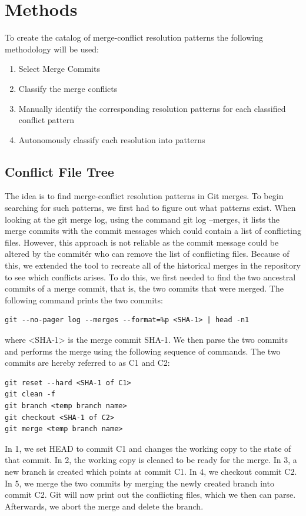 \chapter{Methods}
To create the catalog of merge-conflict resolution patterns the following methodology will be used:
\begin{enumerate}
\item Select Merge Commits
\item Classify the merge conflicts
\item Manually identify the corresponding resolution patterns for each classified conflict pattern
\item Autonomously classify each resolution into patterns
\end{enumerate}
\section{Conflict File Tree}
The idea is to find merge-conflict resolution patterns in Git merges. To begin searching for such patterns, we first had to figure out what patterns exist. When looking at the git merge log, using the command git log --merges, it lists the merge commits with the commit messages which could contain a list of conflicting files. However, this approach is not reliable as the commit message could be altered by the commitér who can remove the list of conflicting files. Because of this, we extended the tool to recreate all of the historical merges in the repository to see which conflicts arises. To do this, we first needed to find the two ancestral commits of a merge commit, that is, the two commits that were merged. The following command prints the two commits:
\lstset{language=Bash}
\begin{lstlisting}[frame=single]
git --no-pager log --merges --format=%p <SHA-1> | head -n1
\end{lstlisting}
where <SHA-1> is the merge commit SHA-1. We then parse the two commits and performs the merge using the following sequence of commands. The two commits are hereby referred to as C1 and C2:\\
\lstset{language=Bash,numbers=left,xleftmargin=2em,frame=single,framexleftmargin=1.5em}
\begin{lstlisting}[frame=single]
git reset --hard <SHA-1 of C1>
git clean -f
git branch <temp branch name>
git checkout <SHA-1 of C2>
git merge <temp branch name>
\end{lstlisting}
In 1, we set HEAD to commit C1 and changes the working copy to the state of that commit. In 2,  the working copy is cleaned to be ready for the merge. In 3, a new branch is created which points at commit C1. In 4, we checkout commit C2. In 5, we merge the two commits by merging the newly created branch into commit C2. Git will now print out the conflicting files, which we then can parse. Afterwards, we abort the merge and delete the branch.

